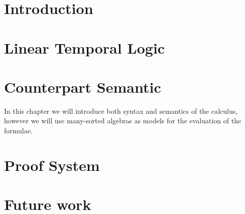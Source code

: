 \documentclass[a4paper,11pt]{report}
\begin{document}
\chapter{Introduction}


\chapter{Linear Temporal Logic}


\chapter{Counterpart Semantic}
In this chapter we will introduce both syntax and semantics of the calculus, however we will use many-sorted algebras as
models for the evaluation of the formulae.





\chapter{Proof System}


\chapter{Future work}

\end{document}
